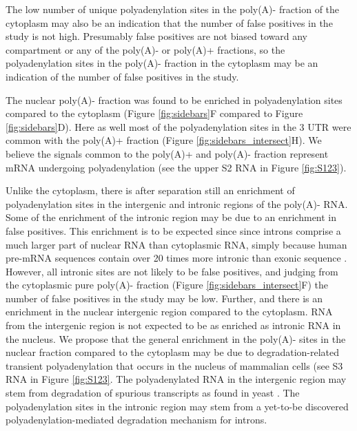 The low number of unique polyadenylation sites in the poly(A)- fraction of the
cytoplasm may also be an indication that the number of false positives in the
study is not high. Presumably false positives are not biased toward any
compartment or any of the poly(A)- or poly(A)+ fractions, so the
polyadenylation sites in the poly(A)- fraction in the cytoplasm may be an
indication of the number of false positives in the study. 

The nuclear poly(A)- fraction was found to be enriched in polyadenylation sites
compared to the cytoplasm (Figure \ref{fig:sidebars}F compared to Figure
\ref{fig:sidebars}D). Here as well most of the polyadenylation sites in the 3\p
UTR were common with the poly(A)+ fraction (Figure
\ref{fig:sidebars_intersect}H). We believe the signals common to the poly(A)+
and poly(A)- fraction represent mRNA undergoing polyadenylation (see the upper
S2 RNA in Figure \ref{fig:S123}).

Unlike the cytoplasm, there is after separation still an enrichment of
polyadenylation sites in the intergenic and intronic regions of the poly(A)-
RNA. Some of the enrichment of the intronic region may be due to an enrichment
in false positives. This enrichment is to be expected since since introns
comprise a much larger part of nuclear RNA than cytoplasmic RNA, simply because
human pre-mRNA sequences contain over 20 times more intronic than exonic
sequence \cite{venter_sequence_2001}. However, all intronic sites are not
likely to be false positives, and judging from the cytoplasmic pure poly(A)-
fraction (Figure \ref{fig:sidebars_intersect}F) the number of false positives
in the study may be low. Further, and there is an enrichment in the nuclear
intergenic region compared to the cytoplasm. RNA from the intergenic region is
not expected to be as enriched as intronic RNA in the nucleus. We propose that
the general enrichment in the poly(A)- sites in the nuclear fraction compared
to the cytoplasm may be due to degradation-related transient polyadenylation
that occurs in the nucleus of mammalian cells \cite{lemay_nuclear_2010} (see S3
RNA in Figure \ref{fig:S123}. The polyadenylated RNA in the intergenic region
may stem from degradation of spurious transcripts as found in yeast
\cite{wyers_cryptic_2005}. The polyadenylation sites in the intronic region may
stem from a yet-to-be discovered polyadenylation-mediated degradation mechanism
for introns.

